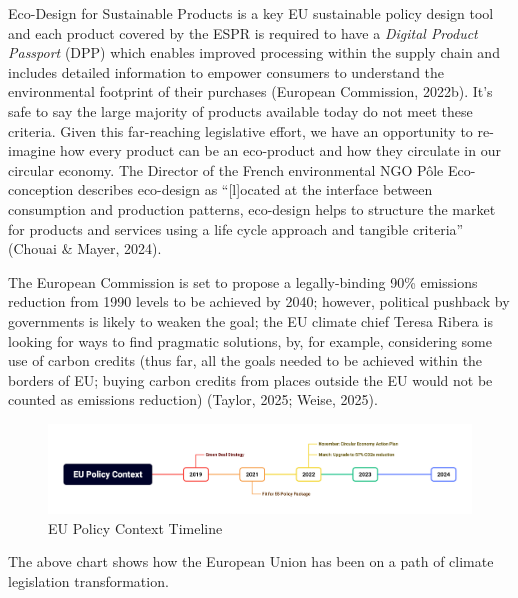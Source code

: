 \documentclass[
  12pt,
  letterpaper,
  DIV=11,
  numbers=noendperiod]{scrartcl}
\begin{document}
Eco-Design for Sustainable Products is a key EU sustainable policy
design tool and each product covered by the ESPR is required to have a
\emph{Digital Product Passport} (DPP) which enables improved processing
within the supply chain and includes detailed information to empower
consumers to understand the environmental footprint of their purchases
(European Commission, 2022b). It's safe to say the large majority of
products available today do not meet these criteria. Given this
far-reaching legislative effort, we have an opportunity to re-imagine
how every product can be an eco-product and how they circulate in our
circular economy. The Director of the French environmental NGO Pôle
Eco-conception describes eco-design as ``{[}l{]}ocated at the interface
between consumption and production patterns, eco-design helps to
structure the market for products and services using a life cycle
approach and tangible criteria'' (Chouai \& Mayer, 2024).

The European Commission is set to propose a legally-binding 90\%
emissions reduction from 1990 levels to be achieved by 2040; however,
political pushback by governments is likely to weaken the goal; the EU
climate chief Teresa Ribera is looking for ways to find pragmatic
solutions, by, for example, considering some use of carbon credits (thus
far, all the goals needed to be achieved within the borders of EU;
buying carbon credits from places outside the EU would not be counted as
emissions reduction) (Taylor, 2025; Weise, 2025).

\begin{figure}[H]

{\centering \includegraphics[width=1\linewidth,height=\textheight,keepaspectratio]{./images/sustainability/eu-policy-context.png}

}

\caption{EU Policy Context Timeline}

\end{figure}%

The above chart shows how the European Union has been on a path of
climate legislation transformation.
\end{document}
